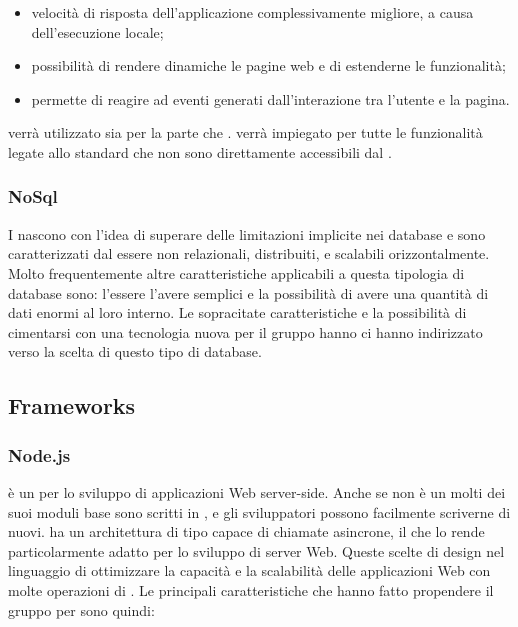\documentclass[12pt,a4paper]{article}
\begin{document}
\begin{itemize}
	\item velocità di risposta dell’applicazione complessivamente migliore, a causa dell’esecuzione locale;
	\item possibilità di rendere dinamiche le pagine web e di estenderne le funzionalità;
	\item permette di reagire ad eventi generati dall’interazione tra l’utente e la pagina.
\end{itemize}

 verrà utilizzato sia per la parte  che .  verrà impiegato per tutte le funzionalità legate allo standard  che non sono direttamente accessibili dal  .

\subsubsection{NoSql}\label{nosql}
I   nascono con l'idea di superare delle limitazioni implicite nei database  e sono caratterizzati dal essere non relazionali, distribuiti,  e scalabili orizzontalmente. Molto frequentemente altre caratteristiche applicabili a questa tipologia di database sono: l'essere  l'avere  semplici e la possibilità di avere una quantità di dati enormi al loro interno. Le sopracitate caratteristiche e la possibilità di cimentarsi con una tecnologia nuova per il gruppo hanno ci hanno indirizzato verso la scelta di questo tipo di database.

\subsection{Frameworks}

\subsubsection{Node.js}\label{node.js}
 è un   per lo sviluppo di applicazioni Web server-side. Anche se  non è un   molti dei suoi moduli base  sono scritti in , e gli sviluppatori possono facilmente scriverne di nuovi.  ha un architettura di tipo  capace di chiamate  asincrone, il che lo rende particolarmente adatto per lo sviluppo di server Web. Queste scelte di design nel linguaggio di ottimizzare la capacità e la scalabilità delle applicazioni Web con molte operazioni di .
Le principali caratteristiche che hanno fatto propendere il gruppo per  sono quindi:
\end{document}
